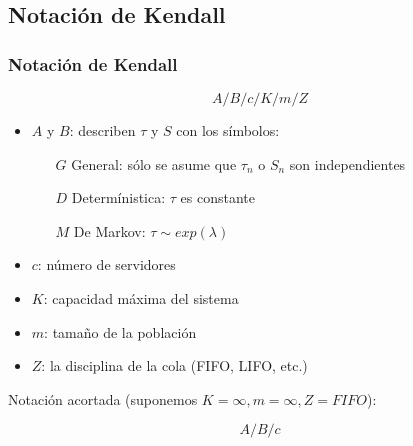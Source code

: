 \documentclass[8pt]{beamer}
\begin{document}
  \subsection{Notación de Kendall}
  \begin{frame}\frametitle{Notación de Kendall}
    \begin{exampleblock}{$$A/B/c/K/m/Z$$}
    \end{exampleblock}
    \begin{itemize}
    \item $A$ y $B$: describen $\tau$ y $S$ con los símbolos:
      \begin{itemize}
      \item [$G$]
        General: sólo se asume que $\tau_n$ o $S_n$ son independientes
      \item [$D$]
        Determínistica: $\tau$ es constante
      \item [$M$]
        De Markov: $\tau \sim exp(\lambda)$
      \end{itemize}
    \item $c$: número de servidores
    \item $K$: capacidad máxima del sistema
    \item $m$: tamaño de la población
    \item $Z$: la disciplina de la cola (FIFO, LIFO, etc.)
    \end{itemize}

    Notación acortada (suponemos $K=\infty,m=\infty,Z=FIFO$):
    \begin{exampleblock}{$$A/B/c$$}
    \end{exampleblock}
  \end{frame}
\end{document}
